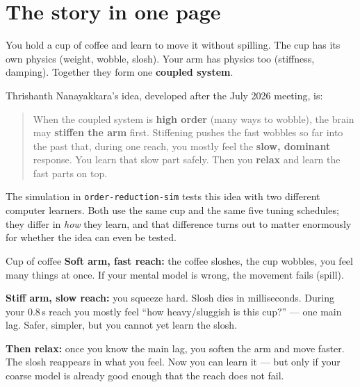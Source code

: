 \documentclass[11pt,a4paper]{article}
\begin{document}
\tableofcontents
\label{sec:toc}
\newpage

\section{The story in one page}
\label{sec:story}

You hold a cup of coffee and learn to move it without spilling. The cup has its
own physics (weight, wobble, slosh). Your arm has physics too (stiffness,
damping). Together they form one \textbf{coupled system}.

Thrishanth Nanayakkara's idea, developed after the July 2026 meeting, is:

\begin{quote}
When the coupled system is \textbf{high order} (many ways to wobble), the brain
may \textbf{stiffen the arm} first. Stiffening pushes the fast wobbles so far
into the past that, during one reach, you mostly feel the \textbf{slow,
dominant} response. You learn that slow part safely. Then you \textbf{relax}
and learn the fast parts on top.
\end{quote}

The simulation in \texttt{order-reduction-sim} tests this idea with two
different computer learners. Both use the same cup and the same five tuning
schedules; they differ in \emph{how} they learn, and that difference turns out
to matter enormously for whether the idea can even be tested.

\begin{examplebox}{Cup of coffee}
\textbf{Soft arm, fast reach:} the coffee sloshes, the cup wobbles, you feel
many things at once. If your mental model is wrong, the movement fails (spill).

\textbf{Stiff arm, slow reach:} you squeeze hard. Slosh dies in milliseconds.
During your 0.8\,s reach you mostly feel ``how heavy/sluggish is this cup?''
--- one main lag. Safer, simpler, but you cannot yet learn the slosh.

\textbf{Then relax:} once you know the main lag, you soften the arm and move
faster. The slosh reappears in what you feel. Now you can learn it --- but only
if your coarse model is already good enough that the reach does not fail.
\end{examplebox}
\end{document}
